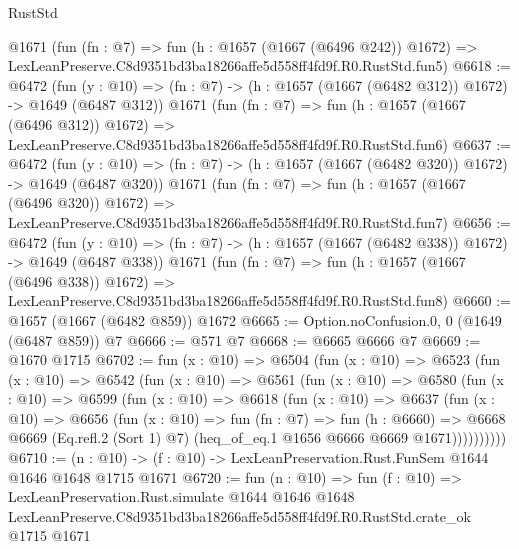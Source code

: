 \begin{lexlean}{RustStd}
\begin{coremodule}
    @1671
    (fun (fn : @7) =>
    fun (h : @1657 (@1667 (@6496 @242)) @1672) =>
    LexLeanPreserve.C8d9351bd3ba18266affe5d558ff4fd9f.R0.RustStd.fun5)
@6618 := @6472
    (fun (y : @10) => (fn : @7) -> (h : @1657 (@1667 (@6482 @312)) @1672) -> @1649 (@6487 @312))
    @1671
    (fun (fn : @7) =>
    fun (h : @1657 (@1667 (@6496 @312)) @1672) =>
    LexLeanPreserve.C8d9351bd3ba18266affe5d558ff4fd9f.R0.RustStd.fun6)
@6637 := @6472
    (fun (y : @10) => (fn : @7) -> (h : @1657 (@1667 (@6482 @320)) @1672) -> @1649 (@6487 @320))
    @1671
    (fun (fn : @7) =>
    fun (h : @1657 (@1667 (@6496 @320)) @1672) =>
    LexLeanPreserve.C8d9351bd3ba18266affe5d558ff4fd9f.R0.RustStd.fun7)
@6656 := @6472
    (fun (y : @10) => (fn : @7) -> (h : @1657 (@1667 (@6482 @338)) @1672) -> @1649 (@6487 @338))
    @1671
    (fun (fn : @7) =>
    fun (h : @1657 (@1667 (@6496 @338)) @1672) =>
    LexLeanPreserve.C8d9351bd3ba18266affe5d558ff4fd9f.R0.RustStd.fun8)
@6660 := @1657 (@1667 (@6482 @859)) @1672
@6665 := Option.noConfusion.{0, 0} (@1649 (@6487 @859)) @7
@6666 := @571 @7
@6668 := @6665 @6666 @7
@6669 := @1670 @1715
@6702 := fun (x : @10) =>
  @6504
    (fun (x : @10) =>
    @6523
      (fun (x : @10) =>
      @6542
        (fun (x : @10) =>
        @6561
          (fun (x : @10) =>
          @6580
            (fun (x : @10) =>
            @6599
              (fun (x : @10) =>
              @6618
                (fun (x : @10) =>
                @6637
                  (fun (x : @10) =>
                  @6656
                    (fun (x : @10) =>
                    fun (fn : @7) =>
                    fun (h : @6660) =>
                    @6668
                      @6669
                      (Eq.refl.{2} (Sort 1) @7)
                      (heq_of_eq.{1} @1656 @6666 @6669 @1671))))))))))
@6710 := (n : @10) -> (f : @10) -> LexLeanPreservation.Rust.FunSem @1644 @1646 @1648 @1715 @1671
@6720 := fun (n : @10) =>
  fun (f : @10) =>
  LexLeanPreservation.Rust.simulate
    @1644
    @1646
    @1648
    LexLeanPreserve.C8d9351bd3ba18266affe5d558ff4fd9f.R0.RustStd.crate_ok
    @1715
    @1671
\end{coremodule}
\end{lexlean}
